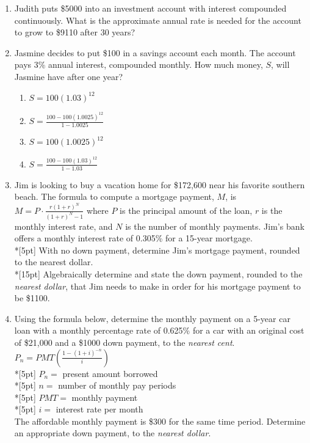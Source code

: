 \documentclass[12pt, oneside]{article}
\begin{document}
\begin{enumerate}
\item Judith puts \$5000 into an investment account with interest compounded continuously. What is the approximate annual rate is needed for the account to grow to \$9110 after 30 years?

\item Jasmine decides to put \$100 in a savings account each month. The account pays 3\% annual interest, compounded monthly. How much money, $S$, will Jasmine have after one year?
\begin{enumerate}
    \item $S=100(1.03)^{12}$
    \item $\displaystyle S=\frac{100-100(1.0025)^{12}}{1-1.0025}$
    \item $S=100(1.0025)^{12}$
    \item $\displaystyle S=\frac{100-100(1.03)^{12}}{1-1.03}$
\end{enumerate} %

\item Jim is looking to buy a vacation home for \$172,600 near his favorite southern beach. The formula to compute a mortgage payment, $M$, is $\displaystyle M=P \cdot \frac{r(1+r)^N}{(1+r)^N-1}$ where $P$ is the principal amount of the loan, $r$ is the monthly interest rate, and $N$ is the number of monthly payments. Jim’s bank offers a monthly interest rate of 0.305\% for a 15-year mortgage.\\*[5pt]
With no down payment, determine Jim’s mortgage payment, rounded to the nearest dollar.\\*[15pt]
Algebraically determine and state the down payment, rounded to the \emph{nearest dollar}, that Jim needs to make in order for his mortgage payment to be \$1100.
 
\item Using the formula below, determine the monthly payment on a 5-year car loan with a monthly percentage rate of 0.625\% for a car with an original cost of \$21,000 and a \$1000 down payment, to the \emph{nearest cent}.\\
$\displaystyle P_n=PMT\left( \frac{1-(1+i)^{-n}}{i} \right)$\\*[5pt]
$P_n = $ present amount borrowed \\*[5pt]
$n = $ number of monthly pay periods\\*[5pt]
$PMT=$ monthly payment\\*[5pt]
$i=$ interest rate per month\\[1in]
The affordable monthly payment is \$300 for the same time period. Determine an appropriate down payment, to the \emph{nearest dollar}. %


\end{enumerate}
\end{document}
